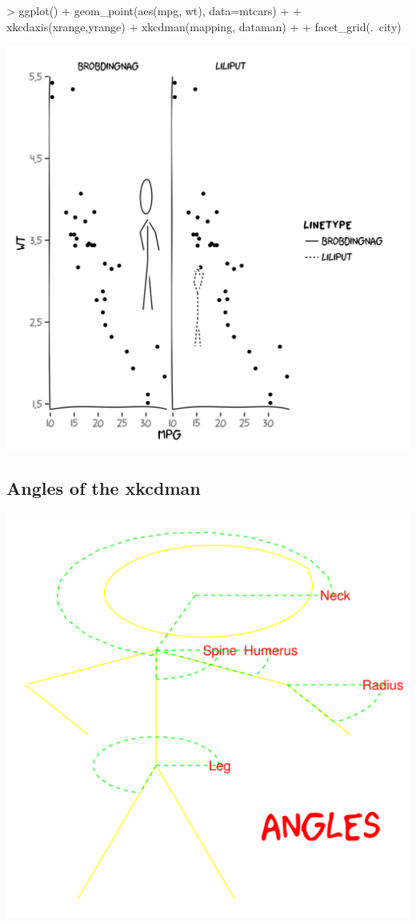 \documentclass[10pt]{article}
\begin{document}
\begin{center}
\begin{Schunk}
\begin{Sinput}
> ggplot() + geom_point(aes(mpg, wt), data=mtcars) + 
+   xkcdaxis(xrange,yrange) + xkcdman(mapping, dataman) +
+   facet_grid(.~city)
\end{Sinput}
\end{Schunk}
\includegraphics{xkcd-intro-facetcity}
\end{center}


\subsection{Angles of the xkcdman}

\begin{center}
\includegraphics{xkcd-intro-angles}
\end{center}
\end{document}
